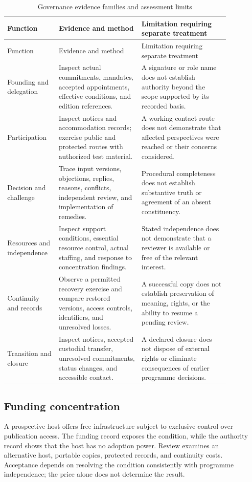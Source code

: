 \documentclass[11pt,a4paper]{article}
\begin{document}
\begin{longtable}{@{}L{0.20\linewidth}L{0.34\linewidth}L{0.36\linewidth}@{}}
\caption{Governance evidence families and assessment limits}\label{tab:charter-evidence}\\
\toprule
Function & Evidence and method & Limitation requiring separate treatment\\
\midrule\endfirsthead
\toprule
Function & Evidence and method & Limitation requiring separate treatment\\
\midrule\endhead
Founding and delegation & Inspect actual commitments, mandates, accepted appointments, effective conditions, and edition references. & A signature or role name does not establish authority beyond the scope supported by its recorded basis.\\
Participation & Inspect notices and accommodation records; exercise public and protected routes with authorized test material. & A working contact route does not demonstrate that affected perspectives were reached or their concerns considered.\\
Decision and challenge & Trace input versions, objections, replies, reasons, conflicts, independent review, and implementation of remedies. & Procedural completeness does not establish substantive truth or agreement of an absent constituency.\\
Resources and independence & Inspect support conditions, essential resource control, actual staffing, and response to concentration findings. & Stated independence does not demonstrate that a reviewer is available or free of the relevant interest.\\
Continuity and records & Observe a permitted recovery exercise and compare restored versions, access controls, identifiers, and unresolved losses. & A successful copy does not establish preservation of meaning, rights, or the ability to resume a pending review.\\
Transition and closure & Inspect notices, accepted custodial transfer, unresolved commitments, status changes, and accessible contact. & A declared closure does not dispose of external rights or eliminate consequences of earlier programme decisions.\\
\bottomrule
\end{longtable}

\subsection{Funding concentration}
A prospective host offers free infrastructure subject to exclusive control over publication access. The funding record exposes the condition, while the authority record shows that the host has no adoption power. Review examines an alternative host, portable copies, protected records, and continuity costs. Acceptance depends on resolving the condition consistently with programme independence; the price alone does not determine the result.
\end{document}
